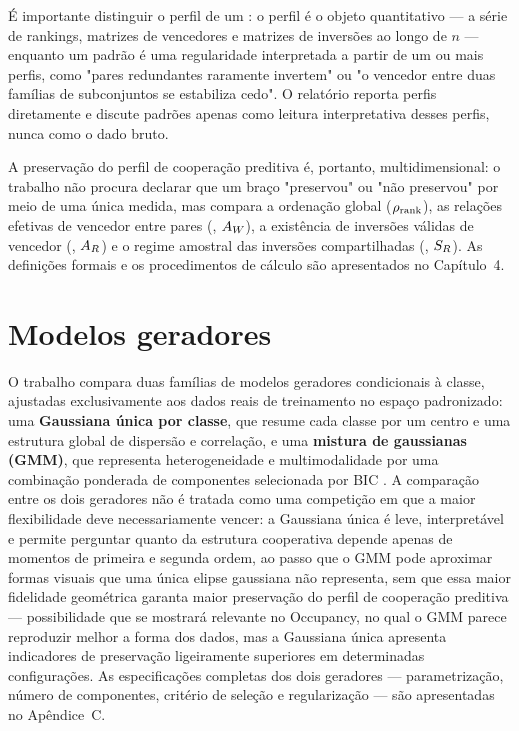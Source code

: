 É importante distinguir o perfil de um \PredictiveCooperationPattern{}: o perfil é o objeto quantitativo --- a série de rankings, matrizes de vencedores e matrizes de inversões ao longo de $n$ --- enquanto um padrão é uma regularidade interpretada a partir de um ou mais perfis, como "pares redundantes raramente invertem" ou "o vencedor entre duas famílias de subconjuntos se estabiliza cedo". O relatório reporta perfis diretamente e discute padrões apenas como leitura interpretativa desses perfis, nunca como o dado bruto.

A preservação do perfil de cooperação preditiva é, portanto, multidimensional: o trabalho não procura declarar que um braço "preservou" ou "não preservou" por meio de uma única medida, mas compara a ordenação global ($\rho_{\mathrm{rank}}$), as relações efetivas de vencedor entre pares (\WinnersAgreement, $A_W$), a existência de inversões válidas de vencedor (\ReversalExistenceAgreement, $A_R$) e o regime amostral das inversões compartilhadas (\ReversalSampleSizeSimilarity, $S_R$). As definições formais e os procedimentos de cálculo são apresentados no Capítulo~4.

\section{Modelos geradores}

O trabalho compara duas famílias de modelos geradores condicionais à classe, ajustadas exclusivamente aos dados reais de treinamento no espaço padronizado: uma \textbf{Gaussiana única por classe}, que resume cada classe por um centro e uma estrutura global de dispersão e correlação, e uma \textbf{mistura de gaussianas (GMM)}, que representa heterogeneidade e multimodalidade por uma combinação ponderada de componentes selecionada por BIC \cite{mclachlan2000,schwarz1978}. A comparação entre os dois geradores não é tratada como uma competição em que a maior flexibilidade deve necessariamente vencer: a Gaussiana única é leve, interpretável e permite perguntar quanto da estrutura cooperativa depende apenas de momentos de primeira e segunda ordem, ao passo que o GMM pode aproximar formas visuais que uma única elipse gaussiana não representa, sem que essa maior fidelidade geométrica garanta maior preservação do perfil de cooperação preditiva --- possibilidade que se mostrará relevante no Occupancy, no qual o GMM parece reproduzir melhor a forma dos dados, mas a Gaussiana única apresenta indicadores de preservação ligeiramente superiores em determinadas configurações. As especificações completas dos dois geradores --- parametrização, número de componentes, critério de seleção e regularização --- são apresentadas no Apêndice~C.

